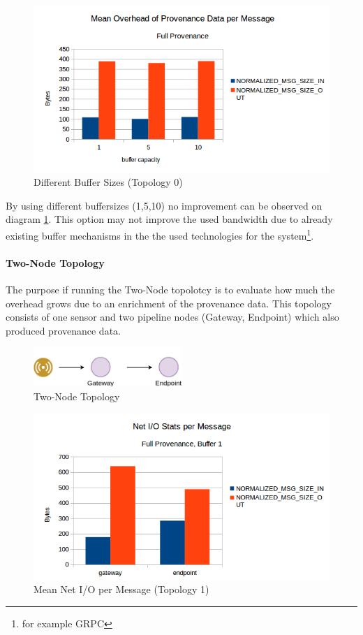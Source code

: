 \begin{figure}[H]
	\center
	\includegraphics[width=\textwidth]{figures/overheaddiagram2.png}
	\caption{Different Buffer Sizes (Topology 0)}
	\label{fig:buffersizes}
\end{figure}

By using different buffersizes (1,5,10) no improvement can be observed on diagram \ref{fig:buffersizes}. This option may not improve the used bandwidth due to already existing buffer mechanisms in the the used technologies for the system\footnote{for example GRPC}.

\paragraph*{Two-Node Topology}
The purpose if running the Two-Node topolotcy is to evaluate how much the overhead grows due to an enrichment of the provenance data. This topology consists of one sensor and two pipeline nodes (Gateway, Endpoint) which also produced provenance data.

\begin{figure}[H]
	\center
	\includegraphics[width=0.5\textwidth]{figures/dataoverheadtopolabeled1.png}
	\caption{Two-Node Topology}
	\label{fig:topo1}
\end{figure}

\begin{figure}[H]
	\center
	\includegraphics[width=\textwidth]{figures/overheaddiagram3.png}
	\caption{Mean Net I/O per Message (Topology 1)}
	\label{fig:topo1meanpermsg}
\end{figure}

